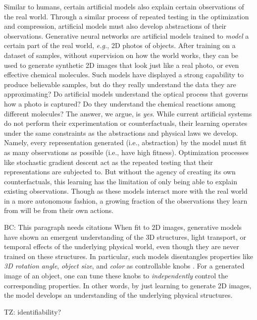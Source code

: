 \documentclass{article}
\newcommand{\tz}[1]{{\color{magenta}TZ: #1}}
\newcommand{\bc}[1]{{\color{olive}BC: #1}}
\theoremstyle{plain}
\theoremstyle{definition}
\theoremstyle{remark}
\begin{document}
Similar to humans, certain artificial models also explain certain observations of the real world. Through a similar process of repeated testing in the optimization and compression, artificial models must also develop abstractions of their observations. Generative neural networks are artificial models trained to \emph{model} a certain part of the real world, \textit{e.g.}, 2D photos of objects. After training on a dataset of samples, without supervision on how the world works, they can be used to generate synthetic 2D images that look just like a real photo, 
or even effective chemical molecules. Such models have displayed a strong capability to produce believable samples, but do they really understand the data they are approximating? Do artificial models understand the optical process that governs how a photo is captured? Do they understand the chemical reactions among different molecules? The answer, we argue, is \emph{yes}. While current artificial systems do not perform their experimentation or counterfactuals, their learning operates under the same constraints as the abstractions and physical laws we develop. Namely, every representation generated (i.e., abstraction) by the model must fit as many observations as possible (i.e., have high fitness). Optimization processes like stochastic gradient descent act as the repeated testing that their representations are subjected to. But without the agency of creating its own counterfactuals, this learning has the limitation of only being able to explain existing observations. Though as these models interact more with the real world in a more autonomous fashion, a growing fraction of the observations they learn from will be from their own actions.

\bc{This paragraph needs citations}
When fit to 2D images, generative models have shown an emergent understanding of the 3D structures, light transport, or temporal effects of the underlying physical world, even though they are never trained on these structures. In particular, such models disentangles properties like \emph{3D rotation angle}, \emph{object size}, and \emph{color} as controllable knobs \citep{jahanian2019steerability}. For a generated image of an object, one can tune these knobs to \emph{independently} control the corresponding properties. In other words, by just learning to generate 2D images, the model develops an understanding of the underlying physical structures. 


\tz{
identifiability?
}
\end{document}
